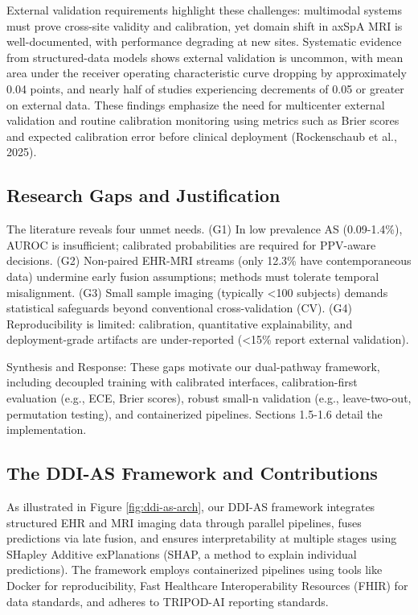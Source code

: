 \documentclass[12pt, a4paper]{article}
\begin{document}
External validation requirements highlight these challenges: multimodal systems must prove cross-site validity and calibration, yet domain shift in axSpA MRI is well-documented, with performance degrading at new sites. Systematic evidence from structured-data models shows external validation is uncommon, with mean area under the receiver operating characteristic curve dropping by approximately 0.04 points, and nearly half of studies experiencing decrements of 0.05 or greater on external data. These findings emphasize the need for multicenter external validation and routine calibration monitoring using metrics such as Brier scores and expected calibration error before clinical deployment (Rockenschaub et al., 2025).
\subsection{Research Gaps and Justification}
The literature reveals four unmet needs. (G1) In low prevalence AS (0.09-1.4\%), AUROC is insufficient; calibrated probabilities are required for PPV-aware decisions. (G2) Non-paired EHR-MRI streams (only 12.3\% have contemporaneous data) undermine early fusion assumptions; methods must tolerate temporal misalignment. (G3) Small sample imaging (typically <100 subjects) demands statistical safeguards beyond conventional cross-validation (CV). (G4) Reproducibility is limited: calibration, quantitative explainability, and deployment-grade artifacts are under-reported (<15\% report external validation).

Synthesis and Response: These gaps motivate our dual-pathway framework, including decoupled training with calibrated interfaces, calibration-first evaluation (e.g., ECE, Brier scores), robust small-n validation (e.g., leave-two-out, permutation testing), and containerized pipelines. Sections 1.5-1.6 detail the implementation.

\subsection{The DDI-AS Framework and Contributions}
As illustrated in Figure \ref{fig:ddi-as-arch}, our DDI-AS framework integrates structured EHR and MRI imaging data through parallel pipelines, fuses predictions via late fusion, and ensures interpretability at multiple stages using SHapley Additive exPlanations (SHAP, a method to explain individual predictions). The framework employs containerized pipelines using tools like Docker for reproducibility, Fast Healthcare Interoperability Resources (FHIR) for data standards, and adheres to TRIPOD-AI reporting standards.
\end{document}
